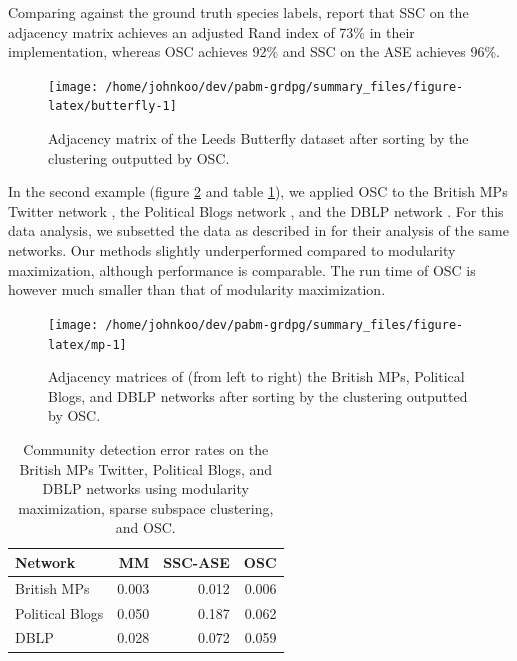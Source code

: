 \documentclass[
  12pt,
]{article}
\theoremstyle{definition}
\theoremstyle{definition}
\theoremstyle{definition}
\theoremstyle{definition}
\theoremstyle{remark}
\begin{document}
Comparing against the ground truth species labels, \citet{noroozi2019estimation}
report that SSC on the adjacency matrix achieves an adjusted Rand index of 73\% in their implementation, whereas OSC achieves 92\% and SSC on the ASE achieves 96\%.

\begin{figure}[H]

{\centering \texttt{[image: /home/johnkoo/dev/pabm-grdpg/summary\_files/figure-latex/butterfly-1]}

}

\caption{Adjacency matrix of the Leeds Butterfly dataset 
after sorting by the clustering outputted by OSC.}\label{fig:butterfly}
\end{figure}

In the second example (figure \ref{fig:mp} and table \ref{tab:unnamed-chunk-6}), we applied OSC to the British MPs Twitter network
\citep{greene2013producing}, the Political Blogs network
\citep{10.1145/1134271.1134277}, and the DBLP network
\citep{NIPS2009_3855, 10.1007/978-3-642-15880-3_42}.
For this data analysis, we subsetted the data as described in
\citet{307cbeb9b1be48299388437423d94bf1} for their analysis of the
same networks. Our methods slightly underperformed compared to modularity
maximization, although performance is comparable.
The run time of OSC is however much smaller than that of modularity maximization.

\begin{figure}[H]
{\centering \texttt{[image: /home/johnkoo/dev/pabm-grdpg/summary\_files/figure-latex/mp-1]}
}
\caption{Adjacency matrices of (from left to right) the British MPs, Political Blogs, and DBLP networks after sorting by the clustering outputted by OSC.}\label{fig:mp}
\end{figure}

\begin{table}[H]
\centering
\begin{tabular}[t]{l|r|r|r}
\hline
Network & MM & SSC-ASE & OSC\\
\hline
British MPs & 0.003 & 0.012 & 0.006\\
\hline
Political Blogs & 0.050 & 0.187 & 0.062\\
\hline
DBLP & 0.028 & 0.072 & 0.059\\
\hline
\end{tabular}
\caption{\label{tab:unnamed-chunk-6}Community detection error rates on the British MPs Twitter, Political Blogs, and DBLP networks using modularity maximization, sparse subspace clustering, and OSC.}
\end{table}
\end{document}
